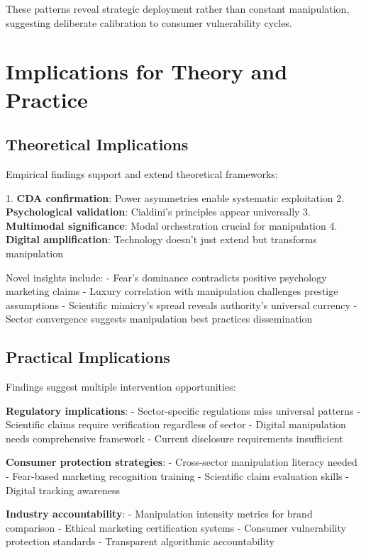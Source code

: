 These patterns reveal strategic deployment rather than constant manipulation, suggesting deliberate calibration to consumer vulnerability cycles.

\section{Implications for Theory and Practice}
\label{sec:empirical_implications}

\subsection{Theoretical Implications}

Empirical findings support and extend theoretical frameworks:

1. \textbf{CDA confirmation}: Power asymmetries enable systematic exploitation
2. \textbf{Psychological validation}: Cialdini's principles appear universally
3. \textbf{Multimodal significance}: Modal orchestration crucial for manipulation
4. \textbf{Digital amplification}: Technology doesn't just extend but transforms manipulation

Novel insights include:
- Fear's dominance contradicts positive psychology marketing claims
- Luxury correlation with manipulation challenges prestige assumptions
- Scientific mimicry's spread reveals authority's universal currency
- Sector convergence suggests manipulation best practices dissemination

\subsection{Practical Implications}

Findings suggest multiple intervention opportunities:

\textbf{Regulatory implications}:
- Sector-specific regulations miss universal patterns
- Scientific claims require verification regardless of sector
- Digital manipulation needs comprehensive framework
- Current disclosure requirements insufficient

\textbf{Consumer protection strategies}:
- Cross-sector manipulation literacy needed
- Fear-based marketing recognition training
- Scientific claim evaluation skills
- Digital tracking awareness

\textbf{Industry accountability}:
- Manipulation intensity metrics for brand comparison
- Ethical marketing certification systems
- Consumer vulnerability protection standards
- Transparent algorithmic accountability

